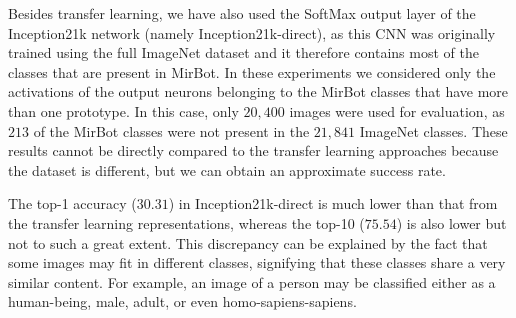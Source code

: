 \documentclass[final, twocolumn]{elsarticle}
\begin{document}
Besides transfer learning, we have also used the SoftMax output layer of the Inception21k network (namely Inception21k-direct), as this CNN was originally trained using the full ImageNet dataset and it therefore contains most of the classes that are present in MirBot. In these experiments we considered only the activations of the output neurons belonging to the MirBot classes that have more than one prototype. In this case, only $20,400$ images were used for evaluation, as $213$ of the MirBot classes were not present in the $21,841$ ImageNet classes. These results cannot be directly compared to the transfer learning approaches because the dataset is different, but we can obtain an approximate success rate.

The top-1 accuracy ($30.31$) in Inception21k-direct is much lower than that from the transfer learning representations, whereas the top-10 ($75.54$) is also lower but not to such a great extent.  This discrepancy can be explained by the fact that some images may fit in different classes, signifying that these classes share a very similar content. For example, an image of a person may be classified either as a human-being, male, adult, or even homo-sapiens-sapiens.
\end{document}
